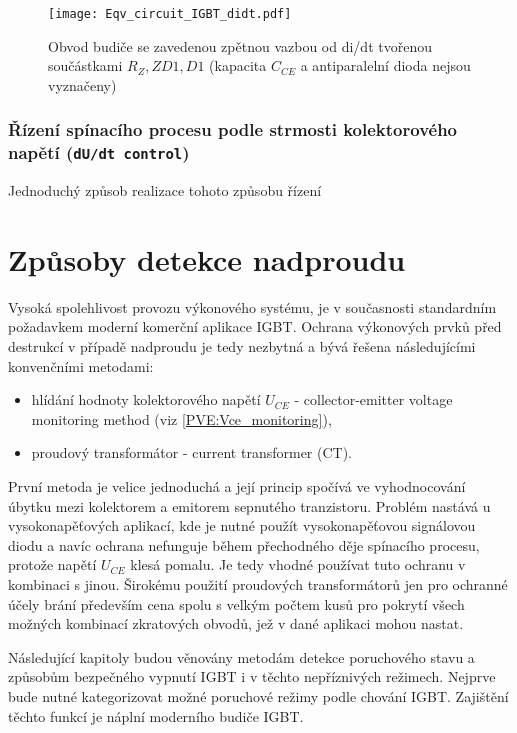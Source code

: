         \begin{figure}[ht!]
          \centering
          \texttt{[image: Eqv\_circuit\_IGBT\_didt.pdf]}
          \caption{Obvod budiče se zavedenou zpětnou vazbou od di/dt tvořenou součástkami $R_Z, ZD1, D1$ (kapacita $C_{CE}$ a antiparalelní dioda nejsou vyznačeny)}\label{VE:fig_didt}
        \end{figure}

      \subsubsection{Řízení spínacího procesu podle strmosti kolektorového napětí (\texttt{dU/dt control}) }
        Jednoduchý způsob realizace tohoto způsobu řízení

   \section{Způsoby detekce nadproudu}%

     Vysoká spolehlivost provozu výkonového systému, je v současnosti standardním požadavkem 
     moderní komerční aplikace IGBT. Ochrana výkonových prvků před destrukcí v případě nadproudu je 
     tedy nezbytná a bývá řešena následujícími konvenčními metodami:
     \begin{itemize}
       \item hlídání hodnoty kolektorového napětí $U_{CE}$ - collector-emitter voltage monitoring  
             method (viz \ref{PVE:Vce_monitoring}),
       \item proudový transformátor - current transformer (CT).
     \end{itemize}
     První metoda je velice jednoduchá a její princip spočívá ve vyhodnocování úbytku mezi 
     kolektorem a emitorem sepnutého tranzistoru. Problém nastává u vysokonapěťových aplikací, kde 
     je nutné použít vysokonapěťovou signálovou diodu a navíc ochrana nefunguje během přechodného 
     děje spínacího procesu, protože napětí $U_{CE}$ klesá pomalu. Je tedy vhodné používat tuto 
     ochranu v kombinaci s jinou. Širokému použití proudových transformátorů jen pro ochranné účely 
     brání především cena spolu s velkým počtem kusů pro pokrytí všech možných kombinací zkratových 
     obvodů, jež v dané aplikaci mohou nastat.

     Následující kapitoly budou věnovány metodám detekce poruchového stavu a způsobům bezpečného 
     vypnutí IGBT i v těchto nepříznivých režimech. Nejprve bude nutné kategorizovat možné 
     poruchové režimy podle chování IGBT. Zajištění těchto funkcí je náplní moderního budiče IGBT.

